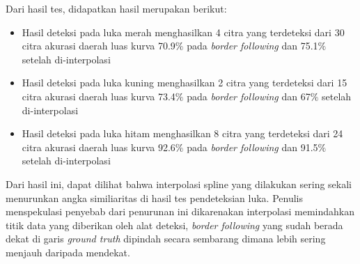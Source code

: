Dari hasil tes, didapatkan hasil merupakan berikut:
\begin{itemize}
	\item Hasil deteksi pada luka merah menghasilkan 4 
	citra yang terdeteksi dari 30 citra  akurasi daerah luas 
	kurva 70.9$\%$ pada \textit{border following} 
	dan 75.1$\%$ setelah di-interpolasi
	\item Hasil deteksi pada luka kuning menghasilkan 2 
	citra yang terdeteksi dari 15 citra  akurasi daerah luas 
	kurva 73.4$\%$ pada \textit{border following} 
	dan 67$\%$ setelah di-interpolasi
	\item Hasil deteksi pada luka hitam menghasilkan 8 
	citra yang terdeteksi dari 24	 citra  akurasi daerah luas 
	kurva 92.6$\%$ pada \textit{border following} 
	dan 91.5$\%$ setelah di-interpolasi
\end{itemize}
Dari hasil ini, dapat dilihat bahwa interpolasi spline 
yang dilakukan sering sekali menurunkan angka similiaritas 
di hasil tes pendeteksian luka. Penulis menspekulasi penyebab 
dari penurunan ini dikarenakan interpolasi memindahkan titik 
data yang diberikan oleh alat deteksi, \textit{border following} 
yang sudah berada dekat di garis \textit{ground truth} dipindah 
secara sembarang dimana lebih sering menjauh daripada mendekat.

